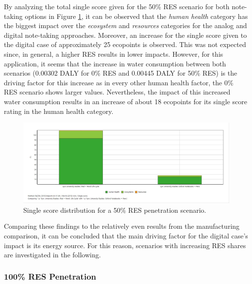 By analyzing the total single score given for the 50\% RES scenario for both note-taking options in Figure \ref{fig:single_score_RES50}, it can be observed that the \textit{human health} category has the biggest impact over the \textit{ecosystem} and \textit{resources} categories for the analog and digital note-taking approaches. Moreover, an increase for the single score given to the digital case of approximately 25 ecopoints is observed. This was not expected since, in general, a higher RES results in lower impacts. However, for this application, it seems that the increase in water consumption between both scenarios (0.00302 DALY for 0\% RES and 0.00445 DALY for 50\% RES) is the driving factor for this increase as in every other human health factor, the 0\% RES scenario shows larger values. Nevertheless, the impact of this increased water consumption results in an increase of about 18 ecopoints for its single score rating in the human health category.

\begin{figure}[H]
    \centering
    \includegraphics[width=\textwidth]{images/RES_50/Single_Score_RES_50.JPG}
    \caption{Single score distribution for a 50\% RES penetration scenario.}\label{fig:single_score_RES50}
\end{figure}

Comparing these findings to the relatively even results from the manufacturing comparison, it can be concluded that the main driving factor for the digital case's impact is its energy source. For this reason, scenarios with increasing RES shares are investigated in the following.

\subsubsection{100\% RES Penetration}

